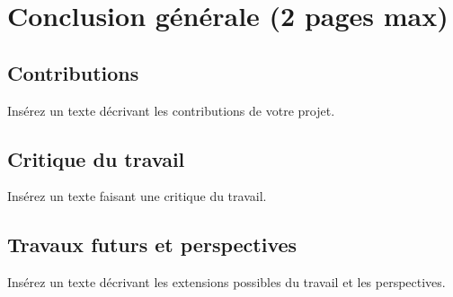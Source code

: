 \chapter{Conclusion générale (2 pages max)}

\section{Contributions}
Insérez un texte décrivant les contributions de votre projet. 

\section{Critique du travail}
Insérez un texte faisant une critique du travail.  

\section{Travaux futurs et perspectives}
Insérez un texte décrivant les extensions possibles du travail et les perspectives. 